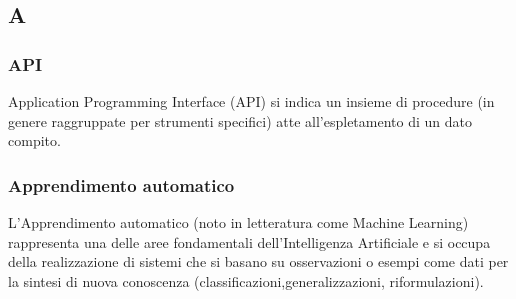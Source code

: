\subsection*{\textbf{\hfill \Huge{A} \hfill}} 
\subsubsection*{API}
Application Programming Interface (API) si indica un insieme di procedure (in genere raggruppate per strumenti specifici) atte all'espletamento di un dato compito.
\subsubsection*{Apprendimento automatico}
L’Apprendimento automatico (noto in letteratura come Machine Learning) rappresenta una delle aree fondamentali dell’Intelligenza Artificiale e si occupa della realizzazione di sistemi che si basano su osservazioni o esempi come dati per la  sintesi di nuova conoscenza (classificazioni,generalizzazioni, riformulazioni).
